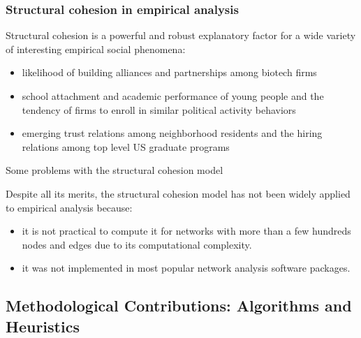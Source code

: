 \documentclass[ignorenonframetext,red,8pt,notes=hide]{beamer}
\begin{document}
\begin{frame}
\frametitle{Structural cohesion in empirical analysis}

Structural cohesion is a powerful and robust explanatory factor for a wide variety of interesting empirical social phenomena: 

\begin{itemize}

\item likelihood of building alliances and partnerships among biotech firms \citep{powell:2005}

\item school attachment and academic performance of young people and the tendency of firms to enroll in similar political activity behaviors \citep{moody:2003}

\item emerging trust relations among neighborhood residents and the hiring relations among top level US graduate programs \citep{grannis:2009}

\end{itemize}

\pause

\begin{block}{Some problems with the structural cohesion model}

Despite all its merits, the structural cohesion model has not been widely applied to empirical analysis because:

\begin{itemize}

\item it is not practical to compute it for networks with more than a few hundreds nodes and edges due to its computational complexity.

\item it was not implemented in most popular network analysis software packages.

\end{itemize}
\end{block}
\end{frame}

\subsection{Methodological Contributions: Algorithms and Heuristics}
\end{document}
